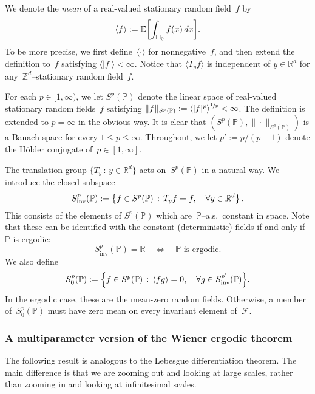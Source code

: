 \documentclass[11pt]{article} %
\let\oldsquare\square %
\renewcommand{\square}{\oldsquare}
\numberwithin{equation}{section}
\theoremstyle{definition}
\let\originalleft\left
\let\originalright\right
\renewcommand{\left}{\mathopen{}\mathclose\bgroup\originalleft}
\renewcommand{\right}{\aftergroup\egroup\originalright}
\newcommand*{\R}{\ensuremath{\mathbb{R}}}
\newcommand*{\Zd}{\ensuremath{\mathbb{Z}^d}}
\newcommand*{\Rd}{\ensuremath{\mathbb{R}^d}}
\newcommand{\cu}{\square}
\newcommand{\F}{\mathcal{F}}
\renewcommand{\P}{\mathbb{P}}
\newcommand{\E}{\mathbb{E}}
\begin{document}
\smallskip

We denote the \emph{mean} of a real-valued stationary random field~$f$ by
\begin{equation}
\left\langle f \right\rangle
:=
\E \biggl[ \int_{\cu_0} f(x)\,dx \biggr]. 
\end{equation}
To be more precise, we first define~$\langle \cdot \rangle$ for nonnegative~$f$, and then extend the definition to~$f$ satisfying $\langle |f| \rangle <\infty$. Notice that  $\langle T_y f \rangle$ is independent of $y\in\Rd$ for any~$\Zd$--stationary random field~$f$. 

\smallskip

For each $p\in [1,\infty)$, we let $S^p(\P)$ denote the linear space of real-valued stationary random fields~$f$ satisfying $\| f \|_{S^p(\P)} := \left\langle |f|^p \right\rangle^{\sfrac1p} <\infty$. The definition is extended to $p=\infty$ in the obvious way. It is clear that $(S^p(\P), \| \cdot\|_{S^p(\P)})$ is a Banach space for every $1\leq p \leq \infty$. 
Throughout, we let $p':=p/(p-1)$ denote the H\"older conjugate of~$p\in[1,\infty]$. 

\smallskip

The translation group $\{ T_y \,:\, y\in \Rd \}$ acts on~$S^p(\P)$ in a natural way. We introduce the closed subspace
\begin{equation}
S^p_{\mathrm{inv}}(\P) := \left\{ f \in S^p(\P) \,:\,  T_yf = f, \quad \forall y\in\Rd \right\} \,.
\end{equation}
This consists of the elements of $S^p(\P)$ which are~$\P$--a.s.~constant in space. Note that these can be identified with the constant (deterministic) fields if and only if~$\P$ is ergodic:
\begin{equation}
\label{e.ergodicityduh}
S^p_{\mathrm{inv}}(\P) = \R \quad \iff \quad 
\text{$\P$ is ergodic.}
\end{equation}
We also define
\begin{equation}
S^p_{0}(\P):=
\left\{ f \in S^p(\P) \,:\,  
\left\langle f g \right\rangle = 0, \quad 
\forall g \in S^{p'}_{\mathrm{inv}}(\P)
\right\}.
\end{equation}
In the ergodic case, these are the mean-zero random fields. Otherwise, a member of~$S^p_{0}(\P)$ must have zero mean on every invariant element of~$\F$. 

\subsubsection{A multiparameter version of the Wiener ergodic theorem}
The following result is analogous to the Lebesgue differentiation theorem. The main difference is that we are zooming out and looking at large scales, rather than zooming in and looking at infinitesimal scales. 
\end{document}
